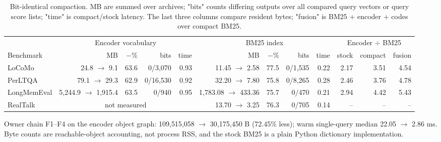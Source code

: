 \begin{table}[tbp]
\centering
\footnotesize
\caption{Bit-identical compaction. MB are summed over archives; "bits" counts differing outputs over all compared query vectors or query score lists; "time" is compact/stock latency. The last three columns compare resident bytes; "fusion" is BM25 + encoder + codes over compact BM25.}
\label{tab:compaction}
\begin{adjustbox}{max width=\linewidth}\begin{tabular}{@{}l r r r r r r r r r r r@{}}
\toprule
& \multicolumn{4}{c}{Encoder vocabulary} & \multicolumn{4}{c}{BM25 index} & \multicolumn{3}{c}{Encoder $\div$ BM25} \\
\cmidrule(lr){2-5}\cmidrule(lr){6-9}\cmidrule(l){10-12}
Benchmark & MB & $-$\% & bits & time & MB & $-$\% & bits & time & stock & compact & fusion \\
\midrule
LoCoMo & 24.8 $\to$ 9.1 & 63.6 & 0/3{,}070 & 0.93 & 11.45 $\to$ 2.58 & 77.5 & 0/1{,}535 & 0.22 & 2.17 & 3.51 & 4.54 \\
PerLTQA & 79.1 $\to$ 29.3 & 62.9 & 0/16{,}530 & 0.92 & 32.20 $\to$ 7.80 & 75.8 & 0/8{,}265 & 0.28 & 2.46 & 3.76 & 4.78 \\
LongMemEval & 5{,}244.9 $\to$ 1{,}915.4 & 63.5 & 0/940 & 0.95 & 1{,}783.08 $\to$ 433.36 & 75.7 & 0/470 & 0.21 & 2.94 & 4.42 & 5.43 \\
RealTalk & \multicolumn{4}{c}{not measured} & 13.70 $\to$ 3.25 & 76.3 & 0/705 & 0.14 & -- & -- & -- \\
\bottomrule
\end{tabular}\end{adjustbox}
\par\smallskip\parbox{\linewidth}{\footnotesize Owner chain F1--F4 on the encoder object graph: 109{,}515{,}058 $\to$ 30{,}175{,}450 B (72.45\% less); warm single-query median 22.05 $\to$ 2.86 ms. Byte counts are reachable-object accounting, not process RSS, and the stock BM25 is a plain Python dictionary implementation.}
\end{table}
